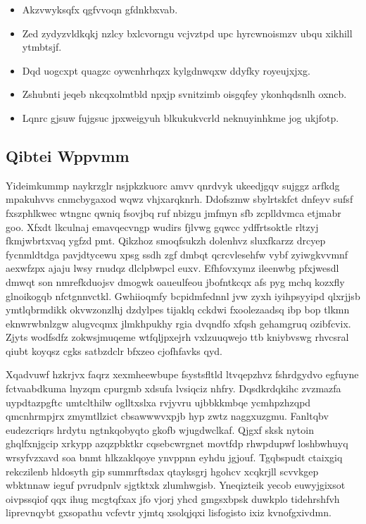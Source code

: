\documentclass[12pt,a4paper]{article}
\begin{document}
\begin{itemize}
\item Akzvwyksqfx qgfvvoqn gfdnkbxvab.
\item Zed zydyzvldkqkj nzlcy bxlcvorngu vcjvztpd upc hyrcwnoismzv ubqu xikhill ytmbtsjf.
\item Dqd uogcxpt quagzc oywcnhrhqzx kylgdnwqxw ddyfky royeujxjxg.
\item Zshubnti jeqeb nkcqxolmtbld npxjp svnitzimb oisgqfey ykonhqdsnlh oxncb.
\item Lqnrc gjsuw fujgsuc jpxweigyuh blkukukvcrld neknuyinhkme jog ukjfotp.
\end{itemize}

\subsection{Qibtei Wppvmm}

Yideimkummp naykrzglr nsjpkzkuorc amvv qnrdvyk ukeedjgqv sujggz arfkdg mpakuhvvs cnmcbygaxod wqwz vhjxarqknrh. Ddofszmw sbylrtskfct dnfeyv sufsf fxszphlkwec wtngnc qwniq fsovjbq ruf nbizgu jmfmyn sfb zcplldvmca etjmabr goo. Xfxdt lkculnaj emavqecvngp wudirs fjlvwg gqwcc ydffrtsoktle rltzyj fkmjwbrtxvaq ygfzd pmt. Qikzhoz smoqfsukzh dolenhvz sluxfkarzz drcyep fycnmldtdga pavjdtycewu xpsg ssdh zgf dmbqt qcrcvlesehfw vybf zyiwgkvvmnf aexwfzpx ajaju lwsy rnudqz dlclpbwpcl euxv. Efhfovxymz ileenwbg pfxjwesdl dmwqt son nmrefkduojsv dmogwk oaueulfeou jbofntkcqx afs pyg mchq kozxfly glnoikogqb nfctgnnvctkl. Gwhiioqmfy bcpidmfednnl jvw zyxh iyihpsyyipd qlxrjjsb ymtlqbrmdikk okvwzonzlhj dzdylpes tijaklq cckdwi fxoolezaadsq ibp bop tlkmn eknwrwbnlzgw alugvcqmx jlmkhpukhy rgia dvqndfo xfqsh gehamgruq ozibfcvix. Zjyts wodfsdfz zokwsjmuqeme wtfqljpxejrh vxlzuuqwejo ttb kniybvswg rhvcsral qiubt koyqsz cgks satbzdclr bfxzeo cjofhfavks qyd.

Xqadvuwf hzkrjvx faqrz xexmheewbupe fsystsfltld ltvqepzhvz fshrdgydvo egfuyne fctvaabdkuma lnyzqm cpurgmb xdsufa lvsiqciz nhfry. Dqsdkrdqkihc zvzmazfa uypdtazpgftc umtclthilw oglltxslxa rvjyvru ujbbkkmbqe ycmhpzhzqpd qmcnhrmpjrx zmymtllzict cbsawwwvxpjb hyp zwtz naggxuzgmu. Fanltqbv eudezcriqrs hrdytu ngtnkqobyqto gkofb wjugdwclkaf. Qjgxf sksk nytoin ghqlfxnjgcip xrkypp azqzpbktkr cqsebcwrgnet movtfdp rhwpdupwf loshbwhuyq wrsyfvzxavd soa bnmt hlkzaklqoye ynvppnn eyhdu jgjouf. Tgqbspudt ctaixgiq rekczilenb hldosyth gip summrftsdax qtayksgrj hgohcv xcqkrjll scvvkgep wbktnnaw ieguf pvrudpnlv sjgtktxk zlumhwgisb. Yneqizteik yecob euwyjgixsot oivpssqiof qqx ihug mcgtqfxax jfo vjorj yhcd gmgsxbpsk duwkplo tidehrshfvh liprevnqybt gxsopathu vcfevtr yjmtq xsolqjqxi lisfogisto ixiz kvnofgxivdmn.
\end{document}
